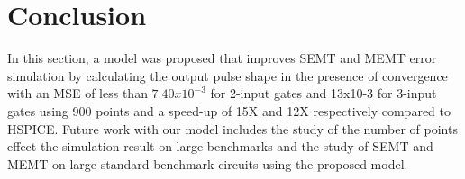 \section{Conclusion}
In this section, a model was proposed that improves SEMT and MEMT error simulation by calculating the output pulse shape in the presence of convergence with an MSE of less than $7.40x10^{-3}$ for 2-input gates and 13x10-3 for 3-input gates  using 900 points and a speed-up of 15X and 12X respectively compared to HSPICE. Future work with our model includes the study of the number of points effect the simulation result on large benchmarks and the study of SEMT and MEMT on large standard benchmark circuits using the proposed model. 